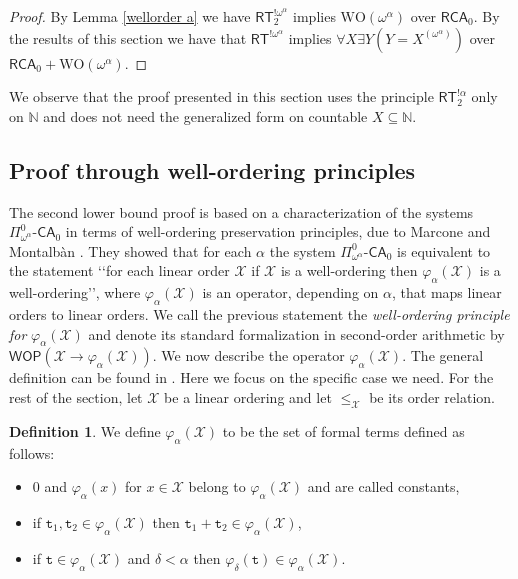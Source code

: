 \documentclass[11pt]{amsart}
\theoremstyle{definition}
\newtheorem{definition}[thm]{Definition}
\theoremstyle{remark}
\theoremstyle{plain}
\newcommand{\numberset}{\mathbb}
\newcommand{\N}{\numberset{N}}
\def\X{\mathcal{X}}
\def\a{\alpha}
\def\d{\delta}
\newcommand{\RCA}{\mathsf{RCA}_0}
\newcommand{\RT}{\mathsf{RT}}
\newcommand{\CA}{\mathsf{\text{-}CA}_0}
\def\WO{{\textrm{WO}}}
\def\N{{\mathbb{N}}}
\begin{document}
\begin{proof}
By Lemma \ref{wellorder a} we have $\RT^{!\omega^\alpha}_2$ implies $\WO(\omega^\alpha)$ over $\RCA$. 
By the results of this section we have that $\RT^{!\omega^\alpha}$ implies $\forall X \exists Y (Y = X^{(\omega^\alpha)})$ 
over $\RCA + \WO(\omega^\alpha)$. 
\end{proof}

We observe that the proof presented in this section uses the principle $\RT^{!\alpha}_2$ only on $\N$ and does not need the generalized form on countable $X\subseteq\N$.

%
%

\subsection{Proof through well-ordering principles}

%
%

The second lower bound proof is based on a characterization of the systems $\Pi^0_{\omega^\alpha} \CA$ in terms of well-ordering preservation principles, due to Marcone and Montalbàn \cite{marconemontalban}.
They showed that for each $\alpha$ the system $\Pi^0_{\omega^\alpha} \CA$ is equivalent to the statement \lq\lq for each linear order $\X$ if $\X$ is a well-ordering then $\varphi_\a (\X)$ is a well-ordering\rq\rq, where $\varphi_\a (\X)$ is an operator, depending on $\a$, that maps linear orders to linear orders. 
We call the previous statement the {\em well-ordering principle for} $\varphi_\a(\X)$ and denote its standard formalization in second-order arithmetic by $\mathsf{WOP} (\X \to \varphi_\a(\X))$.
We now describe the operator $\varphi_\a(\X)$.
The general definition can be found in \cite{marconemontalban}.
Here we focus on the specific case we need.
For the rest of the section, let $\X$ be a linear ordering and let $\le_\X$ be its order relation.

\begin{definition}\label{wop def}
We define $\varphi_\a(\X)$ to be the set of formal terms defined as follows:
\begin{itemize}
    \item $0$ and $\varphi_\a(x)$ for $x \in \X$ belong to $\varphi_\a(\X)$ and are called constants,
    \item if $\mathtt{t}_1,\mathtt{t}_2 \in \varphi_\a(\X)$ then $\mathtt{t}_1+\mathtt{t}_2 \in \varphi_\a(\X)$,
    \item if $\mathtt{t} \in \varphi_\a(\X)$ and $\d < \a$ then $\varphi_\d(\mathtt{t}) \in \varphi_\a(\X)$.
\end{itemize}
\end{definition}
\end{document}
